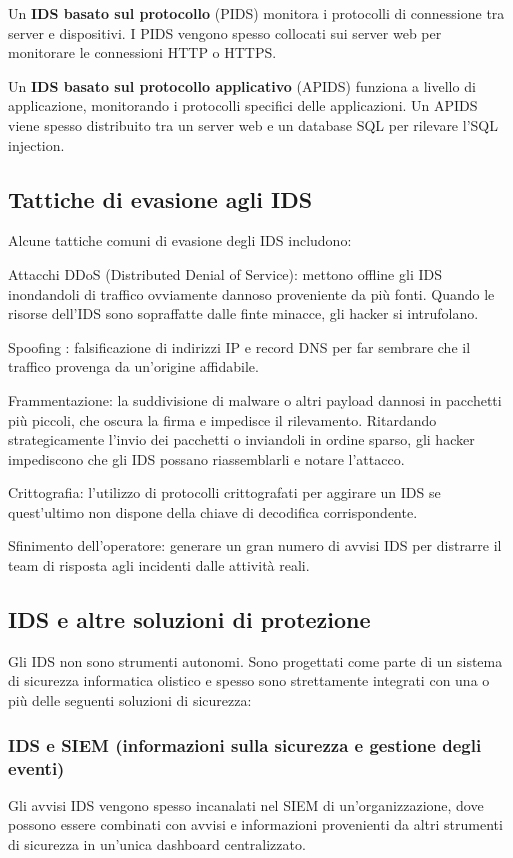 Un \textbf{IDS basato sul protocollo} (PIDS) monitora i protocolli di connessione tra server e dispositivi. I PIDS vengono spesso collocati sui server web per monitorare le connessioni HTTP o HTTPS.

Un \textbf{IDS basato sul protocollo applicativo} (APIDS) funziona a livello di applicazione, monitorando i protocolli specifici delle applicazioni. Un APIDS viene spesso distribuito tra un server web e un database SQL per rilevare l'SQL injection.


\subsection{Tattiche di evasione agli IDS}
Alcune tattiche comuni di evasione degli IDS includono:

Attacchi DDoS (Distributed Denial of Service): mettono offline gli IDS inondandoli di traffico ovviamente dannoso proveniente da più fonti. 
Quando le risorse dell'IDS sono sopraffatte dalle finte minacce, gli hacker si intrufolano.

Spoofing : falsificazione di indirizzi IP e record DNS per far sembrare che il traffico provenga da un'origine affidabile.

Frammentazione: la suddivisione di malware o altri payload dannosi in 
pacchetti più piccoli, che oscura la firma e impedisce il rilevamento. 
Ritardando strategicamente l'invio dei pacchetti o inviandoli in ordine sparso, gli hacker impediscono che 
gli IDS possano riassemblarli e notare l'attacco.

Crittografia: l'utilizzo di protocolli crittografati per aggirare un IDS se quest'ultimo non dispone della chiave di decodifica corrispondente.

Sfinimento dell'operatore: generare un gran numero di avvisi IDS per distrarre il team di risposta agli incidenti dalle attività reali.


\subsection{IDS e altre soluzioni di protezione}
Gli IDS non sono strumenti autonomi. 
Sono progettati come parte di un sistema di sicurezza informatica olistico e spesso sono strettamente integrati con una o più delle seguenti soluzioni di sicurezza:

\subsubsection{IDS e SIEM (informazioni sulla sicurezza e gestione degli eventi)}
Gli avvisi IDS vengono spesso incanalati nel SIEM di un'organizzazione, dove possono essere combinati con 
avvisi e informazioni provenienti da altri strumenti di sicurezza in un'unica dashboard centralizzato.

